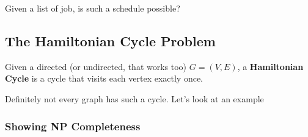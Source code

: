 \documentclass[12pt]{article}
\begin{document}
  Given a list of job, is such a schedule possible?

  \subsection{The Hamiltonian Cycle Problem}

  {
    Given a directed (or undirected, that works too) $G = (V, E)$, a {\bf
    Hamiltonian Cycle} is a cycle that visits each vertex exactly once.
  }

  Definitely not every graph has such a cycle. Let's look at an example



  \subsubsection{Showing NP Completeness}
\end{document}
